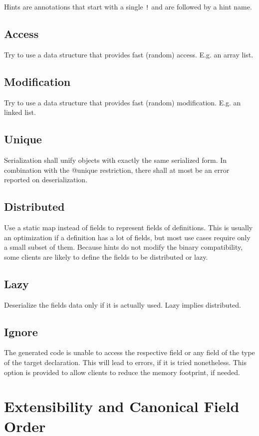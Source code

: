 \documentclass[a4paper,10pt]{article}
\begin{document}
Hints are annotations that start with a single \verb/!/ and are followed by a hint name.

\subsection*{Access}
Try to use a data structure that provides fast (random) access. E.g. an array list.

\subsection*{Modification}
Try to use a data structure that provides fast (random) modification. E.g. an linked list.

\subsection*{Unique}
Serialization shall unify objects with exactly the same serialized form. In combination with the @unique restriction, there shall at most be an error reported on deserialization.

\subsection*{Distributed}
Use a static map instead of fields to represent fields of definitions. This is usually an optimization if a definition has a lot of fields, but most use cases require only a small subset of them. Because hints do not modify the binary compatibility, some clients are likely to define the fields to be distributed or lazy.

\subsection*{Lazy}
Deserialize the fields data only if it is actually used. Lazy implies distributed.

\subsection*{Ignore}
The generated code is unable to access the respective field or any field of the type of the target declaration. This will lead to errors, if it is tried nonetheless. This option is provided to allow clients to reduce the memory footprint, if needed.



\section{Extensibility and Canonical Field Order}
\end{document}
